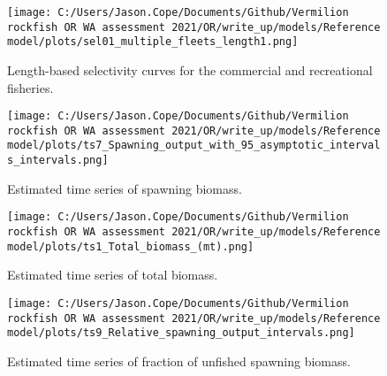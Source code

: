 \documentclass[11pt,
  english,
  a4paper,
]{article}
\begin{document}
\tagmcend\tagstructend


\begin{figure}
\centering
\texttt{[image: C:/Users/Jason.Cope/Documents/Github/Vermilion rockfish OR WA assessment 2021/OR/write\_up/models/Reference model/plots/sel01\_multiple\_fleets\_length1.png]}
\caption{Length-based selectivity curves for the commercial and recreational fisheries.\label{fig:fleet_selectivity}}
\end{figure}

\tagmcend\tagstructend


\begin{figure}
\centering
\texttt{[image: C:/Users/Jason.Cope/Documents/Github/Vermilion rockfish OR WA assessment 2021/OR/write\_up/models/Reference model/plots/ts7\_Spawning\_output\_with\_95\_asymptotic\_intervals\_intervals.png]}
\caption{Estimated time series of spawning biomass.\label{fig:ssb}}
\end{figure}

\tagmcend\tagstructend


\begin{figure}
\centering
\texttt{[image: C:/Users/Jason.Cope/Documents/Github/Vermilion rockfish OR WA assessment 2021/OR/write\_up/models/Reference model/plots/ts1\_Total\_biomass\_(mt).png]}
\caption{Estimated time series of total biomass.\label{fig:tot-bio}}
\end{figure}

\tagmcend\tagstructend


\begin{figure}
\centering
\texttt{[image: C:/Users/Jason.Cope/Documents/Github/Vermilion rockfish OR WA assessment 2021/OR/write\_up/models/Reference model/plots/ts9\_Relative\_spawning\_output\_intervals.png]}
\caption{Estimated time series of fraction of unfished spawning biomass.\label{fig:depl}}
\end{figure}
\end{document}
